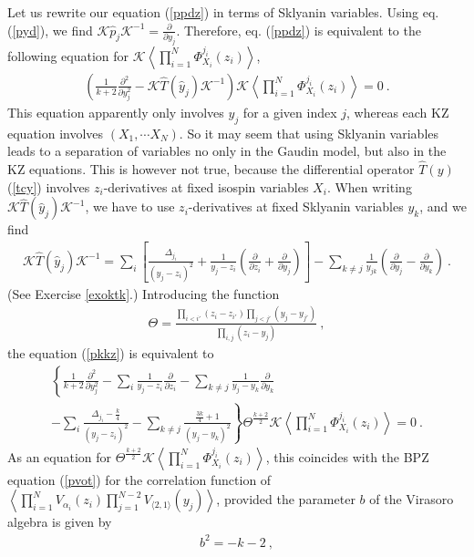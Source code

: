 \documentclass[12pt,a4paper,notitlepage]{report}
\newcommand \la {\left\langle}
\newcommand \ra {\right\rangle}
\newcommand \p {\partial}
\newcommand \pp[1] {{\frac{\p}{\p #1}}}
\numberwithin{equation}{section}
\theoremstyle{break}
\begin{document}
Let us rewrite our equation (\ref{ppdz}) in terms of Sklyanin variables. Using eq. (\ref{pyd}), we find
$\mathcal{K} \hat{p}_j \mathcal{K}^{-1}= \pp{y_j} $. Therefore,  
eq. (\ref{ppdz}) is equivalent to the following equation for $\mathcal{K}\la \prod_{i=1}^N \Phi^{j_i}_{X_i}(z_i)\ra$,
\begin{align}
 \left(\frac{1}{k+2}\frac{\p ^2}{\p y_j^2} - \mathcal{K} \hat{T}(\hat{y}_j) \mathcal{K}^{-1}\right)\mathcal{K}\la \prod_{i=1}^N \Phi^{j_i}_{X_i}(z_i)\ra  = 0\ .
\label{pkkz}
\end{align}
This equation apparently only involves $y_j$ for a given index $j$, whereas each KZ equation involves $(X_1,\cdots X_N)$. 
So it may seem that using Sklyanin variables leads to a separation of variables no only in the Gaudin model, but also
in the KZ equations. 
This is however not true, because the differential operator $\hat{T}(y)$ (\ref{tcy}) involves $z_i$-derivatives at fixed isospin variables $X_i$. When writing $\mathcal{K} \hat{T}(\hat{y}_j) \mathcal{K}^{-1}$, we have to use $z_i$-derivatives at fixed Sklyanin variables $y_k$, and we find
\begin{align}
\mathcal{K} \hat{T}(\hat{y}_j) \mathcal{K}^{-1} = \sum_i\left[\frac{\Delta_{j_i}}{(y_j-z_i)^2}+ \frac{1}{y_j-z_i}\left(\pp{z_i}+\pp{y_j}\right)\right]-\sum_{k\neq j}\frac{1}{y_{jk}}\left(\pp{y_j}-\pp{y_k}\right)\ .
\label{dtyj}
\end{align}
(See Exercise \ref{exoktk}.) 
Introducing the function
\begin{align}
 \Theta = \frac{\prod_{i<i'}(z_i-z_{i'})\prod_{j<j'}(y_j-y_{j'})}{\prod_{i,j}(z_i-y_j)}\ ,
\end{align}
the equation (\ref{pkkz}) is equivalent to 
\begin{multline}
 \left\{\frac{1}{k+2}  \frac{\p^2}{\p y_j^2} - \sum_i\frac{1}{y_j-z_i}\pp{z_i} -\sum_{k\neq j}\frac{1}{y_j-y_k} \pp{y_k}
\right. \\ \left.
 -\sum_i\frac{\Delta_{j_i}-\frac{k}{4}}{(y_j-z_i)^2}  -\sum_{k\neq j}\frac{\frac{3k}{4}+1}{(y_j-y_k)^2}   \right\} \Theta^{\frac{k+2}{2}}\mathcal{K}\la \prod_{i=1}^N \Phi^{j_i}_{X_i}(z_i)\ra = 0\ .
\end{multline}
As an equation for $\Theta^{\frac{k+2}{2}}\mathcal{K}\la \prod_{i=1}^N \Phi^{j_i}_{X_i}(z_i)\ra$,
this coincides with the BPZ equation (\ref{pvot}) for the correlation function of $\la \prod_{i=1}^N V_{\alpha_i}(z_i) \prod_{j=1}^{N-2}V_{\langle 2,1\rangle}(y_j)\ra$, provided the parameter $b$ of the Virasoro algebra is given by 
\begin{align}
 \boxed{ b^2 = -k-2}\ ,
\label{bk}
\end{align}
\end{document}
